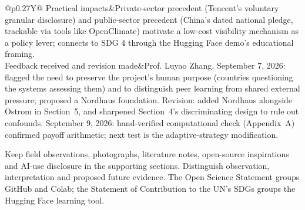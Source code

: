 \begin{table}[H]
\begin{tabularx}{\textwidth}{@{}p{}Y@{}}
Practical impacts&Private-sector precedent (Tencent's voluntary granular disclosure) and public-sector precedent (China's dated national pledge, trackable via tools like OpenClimate) motivate a low-cost visibility mechanism as a policy lever; connects to SDG 4 through the Hugging Face demo's educational framing.\\
Feedback received and revision made&Prof. Luyao Zhang, September 7, 2026: flagged the need to preserve the project's human purpose (countries questioning the systems assessing them) and to distinguish peer learning from shared external pressure; proposed a Nordhaus foundation. Revision: added Nordhaus alongside Ostrom in Section~5, and sharpened Section~4's discriminating design to rule out confounds. September 9, 2026: hand-verified computational check (Appendix~A) confirmed payoff arithmetic; next test is the adaptive-strategy modification.\\
\bottomrule
\end{tabularx}
\end{table}
\noindent Keep field observations, photographs, literature notes, open-source inspirations and AI-use disclosure in the supporting sections. Distinguish observation, interpretation and proposed future evidence. The Open Science Statement groups GitHub and Colab; the Statement of Contribution to the UN's SDGs groups the Hugging Face learning tool.

